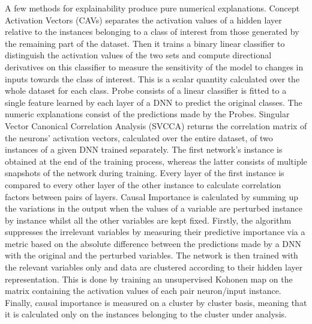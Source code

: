 \documentclass[final,1p,times]{elsarticle}
\begin{document}
A few methods for explainability produce pure numerical explanations. Concept Activation Vectors (CAVs) \cite{kim2018interpretability} separates the activation values of a hidden layer relative to the instances belonging to a class of interest from those generated by the remaining part of the dataset. Then it trains a binary linear classifier to distinguish the activation values of the two sets and compute directional derivatives on this classifier to measure the sensitivity of the model to changes in inputs towards the class of interest. This is a scalar quantity calculated over the whole dataset for each class.
Probe \cite{alain2017understanding} consists of a linear classifier is fitted to a single feature learned by each layer of a DNN to predict the original classes. The numeric explanations consist of the predictions made by the Probes. Singular Vector Canonical Correlation Analysis (SVCCA) \cite{raghu2017svcca} returns the correlation matrix of the neurons' activation vectors, calculated over the entire dataset, of two instances of a given DNN trained separately. The first network's instance is obtained at the end of the training process, whereas the latter consists of multiple snapshots of the network during training. Every layer of the first instance is compared to every other layer of the other instance to calculate correlation factors between pairs of layers.
Causal Importance \cite{feraud2002methodology} is calculated by summing up the variations in the output when the values of a variable are perturbed instance by instance whilst all the other variables are kept fixed. Firstly, the algorithm suppresses the irrelevant variables by measuring their predictive importance via a metric based on the absolute difference between the predictions made by a DNN with the original and the perturbed variables. The network is then trained with the relevant variables only and data are clustered according to their hidden layer representation. This is done by training an unsupervised Kohonen map on the matrix containing the activation values of each pair neuron/input instance. Finally, causal importance is measured on a cluster by cluster basis, meaning that it is calculated only on the instances belonging to the cluster under analysis.
\end{document}
